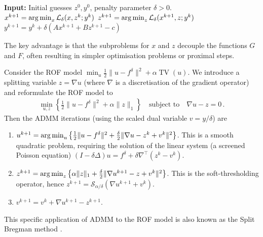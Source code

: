 \begin{algorithm}
\caption{Alternating Direction Method of Multipliers (ADMM)}\label{alg:admm}
\begin{algorithmic}
\State \textbf{Input:} Initial guesses $z^0, y^0$, penalty parameter $\delta > 0$.
\State $x^{k+1} = \operatorname*{arg\,min}_{x} \mathcal{L}_\delta(x, z^k; y^k)$ 
\State $z^{k+1} = \operatorname*{arg\,min}_{z} \mathcal{L}_\delta(x^{k+1}, z; y^k)$ 
\State $y^{k+1} = y^k + \delta (Ax^{k+1} + Bz^{k+1} - c)$ 
\EndFor
\end{algorithmic}
\end{algorithm}

The key advantage is that the subproblems for $x$ and $z$ decouple the functions $G$ and $F$, often resulting in simpler optimisation problems or proximal steps.

\begin{exm}\normalfont
Consider the ROF model $\min_{u} \frac{1}{2}\|u - f^\delta\|^2 + \alpha \operatorname{TV}(u)$. We introduce a splitting variable $z = \nabla u$ (where $\nabla$ is a discretisation of the gradient operator) and reformulate the ROF model to
\begin{align*}
\min_{u, z} \left\{ \frac{1}{2}\|u - f^\delta\|^2 + \alpha \|z\|_1 \right\} \quad \text{subject to} \quad \nabla u - z = 0 \, .
\end{align*}
Then the ADMM iterations (using the scaled dual variable $v = y/\delta$) are
\begin{enumerate}
\item $u^{k+1} = \operatorname*{arg\,min}_{u} \left\{ \frac{1}{2}\|u - f^\delta\|^2 + \frac{\delta}{2} \|\nabla u - z^k + v^k\|^2 \right\}$. This is a smooth quadratic problem, requiring the solution of the linear system (a screened Poisson equation) $(I - \delta \Delta)u = f^\delta + \delta \nabla^\top(z^k - v^k)$.
\item $z^{k+1} = \operatorname*{arg\,min}_z \left\{ \alpha \|z\|_1 + \frac{\delta}{2} \|\nabla u^{k+1} - z + v^k\|^2 \right\}$. This is the soft-thresholding operator, hence $z^{k+1} = \mathcal{S}_{\alpha/\delta}(\nabla u^{k+1} + v^k)$.
\item $v^{k+1} = v^k + \nabla u^{k+1} - z^{k+1}$.
\end{enumerate}
This specific application of ADMM to the ROF model is also known as the Split Bregman method \cite{goldstein2009split}.
\end{exm}

